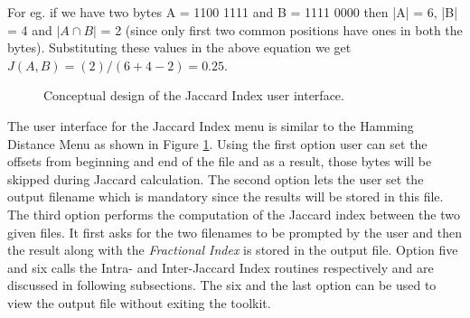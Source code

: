 	For eg. if we have two bytes A = 1100 1111 and B = 1111 0000 then |A| = 6, |B| = 4 and $|A \cap B|$ = 2 (since only first two common positions have ones in both the bytes). Substituting these values in the above equation we get $J(A,B) = (2) / ( 6 + 4 - 2) = 0.25$.\\

	\begin{figure}[h]
	\centering
	\caption{Conceptual design of the Jaccard Index user interface.}
	\label{img:jaccard_ui}
	\end{figure}
	The user interface for the Jaccard Index menu is similar to the Hamming Distance Menu as shown in Figure \ref{img:jaccard_ui}. Using the first option user can set the offsets from beginning and end of the file and as a result, those bytes will be skipped during Jaccard calculation. The second option lets the user set the output filename which is mandatory since the results will be stored in this file. The third option performs the computation of the Jaccard index between the two given
	files. It first asks for the two filenames to be prompted by the user and then the result along with the \emph{Fractional Index} is stored in the output file. Option five and six calls the Intra- and Inter-Jaccard Index routines respectively and are discussed in following subsections. The six and the last option can be used to view the output file without exiting the toolkit.\\

